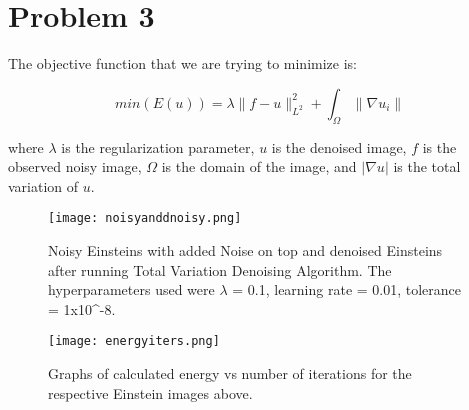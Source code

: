 \documentclass[11pt]{article}
\begin{document}
\section*{Problem 3}

The objective function that we are trying to minimize is:

\begin{equation}
min(E(u)) = \lambda \| f - u \|_{L^2}^2 + \int_\Omega \| \nabla u_i \|
\end{equation}

where $\lambda$ is the regularization parameter, $u$ is the denoised image, $f$ is the observed noisy image, $\Omega$ is the domain of the image, and $|\nabla u|$ is the total variation of $u$.
\begin{figure}[ht]
\begin{center}
\texttt{[image: noisyanddnoisy.png]}
\caption{Noisy Einsteins with added Noise on top and denoised Einsteins after running Total Variation Denoising Algorithm. The hyperparameters used were $\lambda$ = 0.1, learning rate = 0.01, tolerance = 1x10^{-8}.}
\label{fig:lena}
\end{center}
\end{figure}

\FloatBarrier 

\begin{figure}[H] 
\begin{center}
\texttt{[image: energyiters.png]}
\caption{Graphs of calculated energy vs number of iterations for the respective Einstein images above.}
\label{fig:lena}
\end{center}
\end{figure}

\FloatBarrier %
\end{document}
